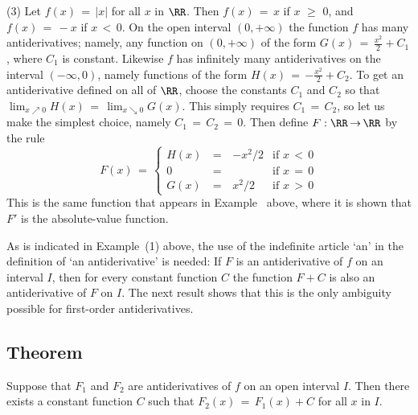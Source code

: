 {        (3) Let $f(x) \,=\, |x|$ for all $x$ in ${\RR}$. Then $f(x) \,=\, x$ if $x\,\,{\geq}\,\,0$, and $f(x) \,=\, -x$ if $x\,<\,0$.
    On the open interval $(0,+{\infty})$ the function $f$ has many antiderivatives;
    namely, any function on $(0,+{\infty})$ of the form $G(x) \,=\, {\displaystyle \frac{x^{2}}{2}+C_{1}}$, where $C_{1}$ is constant.
    Likewise $f$ has infinitely many antiderivatives on the interval $(-{\infty},0)$,
    namely functions of the form $H(x) \,=\, {\displaystyle -\frac{x^{2}}{2}+C_{2}}$.
    To get an antiderivative defined on all of ${\RR}$, choose the constants $C_{1}$ and $C_{2}$ so that $\lim_{x{\nearrow}0} H(x) \,=\, \lim_{x{\searrow}0} G(x)$.
    This simply requires $C_{1} \,=\, C_{2}$, so let us make the simplest choice, namely $C_{1} \,=\, C_{2} \,=\, 0$.
    Then define $F:{\RR} \,{\rightarrow}\, {\RR}$ by the rule
        \begin{displaymath}
        F(x) \,=\, \left\{
        \begin{array}{ccrl}
        H(x) & \,=\, & -x^{2}/2 & \mbox{if $x\,<\,0$} \\
          0  & \,=\, &          & \mbox{if $x\,=\,0$} \\
        G(x) & \,=\, &  x^{2}/2 & \mbox{if $x\,>\,0$}
        \end{array}
                        \right.
        \end{displaymath}
    This is the same function that appears in Example~ above, where it is shown that $F'$ is the absolute-value function.

\VV

        As is indicated in Example~(1) above, the use of the indefinite article `an' in the definition of `an antiderivative' is needed:
    If $F$ is an antiderivative of $f$ on an interval $I$, then for every constant function $C$ the function $F+C$ is also an antiderivative of $F$ on $I$.
    The next result shows that this is the only ambiguity possible for first-order antiderivatives.

\V

             \subsection{\small{\bf Theorem}}
            \label{ThmE45.50}

\V

        Suppose that $F_{1}$ and $F_{2}$ are antiderivatives of $f$ on an open interval $I$.
    Then there exists a constant function $C$ such that $F_{2}(x) \,=\, F_{1}(x) + C$ for all $x$ in $I$.

}
